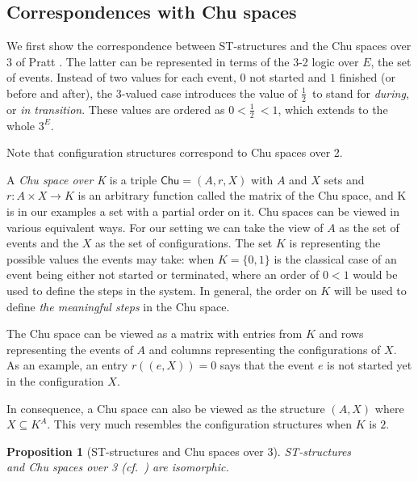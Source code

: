 \documentclass[submission,copyright,creativecommons]{eptcs}
\newtheorem{proposition}[theorem]{Proposition}
\newcounter{case}
\newcommand\executing{\ensuremath{\frac{1}{2}}}
\newcommand{\chuPrat}{\ensuremath{\mathsf{Chu}}}
\begin{document}
\subsection{Correspondences with Chu spaces}

We first show the correspondence between ST-structures and the Chu spaces over 3 of Pratt \cite{Pratt00HDArev}. The latter can be represented in terms of the 3-2 logic over $E$, the set of events. Instead of two values for each event, $0$ not started and $1$ finished (or before and after), the 3-valued case introduces the value of \executing\ to stand for \textit{during}, or \textit{in transition}. These values are ordered as $0 < \executing\ < 1$, which extends to the whole $3^{E}$.

Note that configuration structures \cite{GlabbeekP95config,GlabbeekP09configStruct} correspond to Chu spaces over 2.

A \textit{Chu space over K} is a triple $\chuPrat=(A,r,X)$ with $A$ and $X$ sets and $r:A\times X\rightarrow K$ is an arbitrary function called the matrix of the Chu space, and K is in our examples a set with a partial order on it. Chu spaces can be viewed in various equivalent ways. For our setting we can take the view of $A$ as the set of events and the $X$ as the set of configurations. The set $K$ is representing the possible values the events may take: when $K=\{0,1\}$ is the classical case of an event being either not started or terminated, where an order of $0<1$ would be used to define the steps in the system. In general, the order on $K$ will be used to define \textit{the meaningful steps} in the Chu space.

The Chu space can be viewed as a matrix with entries from $K$ and rows representing the events of $A$ and columns representing the configurations of $X$. As an example, an entry $r((e,X))=0$ says that the event $e$ is not started yet in the configuration $X$.

In consequence, a Chu space can also be viewed as the structure $(A,X)$ where $X\subseteq K^{A}$. This very much resembles the configuration structures when $K$ is $2$.

\begin{proposition}[ST-structures and Chu spaces over 3]\label{prop_STstructChu3}
ST-structures \\and \emph{Chu spaces over 3} (cf.\ \cite[Sec.3]{Pratt00HDArev}) are isomorphic. 
\end{proposition}
\end{document}
